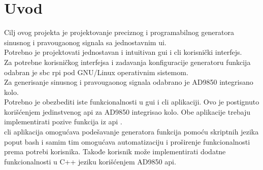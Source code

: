 
\section{Uvod}
Cilj ovog projekta je projektovanje preciznog i programabilnog generatora
sinusnog i pravougaonog signala sa jednostavnim \gls{ui}. \\
Potrebno je projektovati jednostavan i intuitivan \gls{gui} i \gls{cli} korisnički interfejs.
\\

Za potrebne korisničkog interfejsa i zadavanja konfiguracije generatoru funkcija
odabran je \gls{sbc} \gls{rpi} pod GNU/Linux operativnim sistemom. \\
Za generisanje sinusnog i pravougaonog signala odabrano je AD9850 integrisano
kolo. \\

Potrebno je obezbediti iste funkcionalnosti u \gls{gui} i \gls{cli} aplikaciji.
Ovo je postignuto korišćenjem jedinstvenog \gls{api} za AD9850 integrisao
kolo. Obe aplikacije trebaju implementirati pozive funkcija iz \gls{api}
.\\

\gls{cli} aplikacija omogućava podešavanje generatora funkcija pomoću skriptnih jezika
poput \gls{bash} i samim tim omogućava automatizaciju i proširenje
funkcionalnosti prema potrebi korisnika. Takođe korisnik može implementirati
dodatne funkcionalnosti u C++ jeziku korišćenjem AD9850 \gls{api}.

